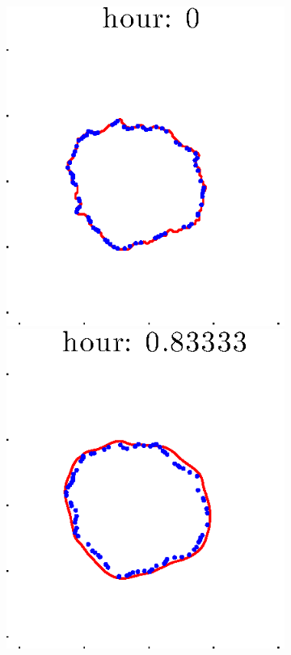 \documentclass[12pt]{article}
\begin{document}
\begin{figure}[h!]
\begin{subfigure}[b]{.3\textwidth}
	\end{subfigure}
	\begin{subfigure}[b]{.3\textwidth}
	\centering
		\includegraphics[height=.15\textheight]{Pos5exp2/secondhalf/first1.eps}
		\includegraphics[height=.15\textheight]{Pos5exp2/secondhalf/first2.eps}

\end{subfigure}
\end{figure}
\end{document}
